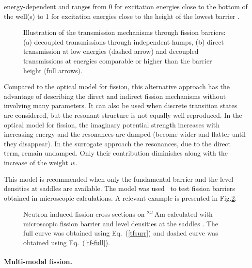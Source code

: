 energy-dependent and ranges from 0 for excitation energies close to the
bottom of the well(s) to 1 for excitation energies close to the height of
the lowest barrier \cite{Sin:07}.
\begin{figure}[tbph]
\caption{Illustration of the transmission mechanisms through fission
barriers: (a) decoupled transmissions through independent humps, (b) direct
transmission at low energies (dashed arrow) and decoupled transmissions at
energies comparable or higher than the barrier height (full arrows).}
\label{fis-ld0.eps}
\end{figure}
Compared to the optical model for fission, this alternative approach has the
advantage of describing the direct and indirect fission mechanisms without
involving many parameters. It can also be used when discrete transition
states are considered, but the resonant structure is not equally well
reproduced. In the optical model for fission, the imaginary potential
strength increases with increasing energy and the resonances are damped
(become wider and flatter until they disappear). In the surrogate approach
the resonances, due to the direct term, remain undamped. Only their
contribution diminishes along with the increase of the weight $w$.

This model is recommended when only the fundamental barrier and the level
densities at saddles are available. The model was used~\cite{Sin:07} to test
fission barriers obtained in microscopic calculations. A relevant
example is presented in Fig.\ref{am41-surr}.
\begin{figure}[htbp]
\caption{Neutron induced fission cross sections on $^{241}$Am calculated
with microscopic fission barrier \protect\cite{Goriely:07-mass} and level
densities at the saddles \protect\cite{Goriely:07-ld}. The full curve was
obtained using Eq.~(\protect\ref{tfsurr}) and dashed curve was obtained using
Eq.~(\protect\ref{tf-full}).}
\label{am41-surr}
\end{figure}

\medskip %

\paragraph*{Multi-modal fission.}

